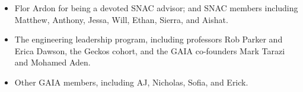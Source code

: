\begin{itemize}
  Gabriel, Haley, Robert, Miriam, Andrea, Sofia, Madison D., Nelson, Larry, Mahika, Jacob, Alan, En, Kelvin, Nathan, Jordan, Sabian, Iris, Madison S., Leah, John, Cecily, Ehina, Maddie, Ben, Noam, Vidhi, Alex, Kotey, Moho, Kunj, Hope, Bimali, Ruiyang, Khai, Anthony, Rumman, Kalvin, and Amina.
  Teamwork is really important to me, and working with you all has been a highlight of my PhD.
  Special shout-outs go to Madison D., who has worked with me on MDOcean for 4 years and has grown so much;
  Bimali, who went above and beyond on the MEEM project and whose work features prominently in ;
  and En, Andrea, and Moho, who turned Wait Terrace into a SEA Lab house. 
  \item Flor Ardon for being a devoted SNAC advisor; and SNAC members 
  including Matthew, Anthony, Jessa, Will, Ethan, Sierra, and Aishat.
  \item The engineering leadership program, including professors Rob Parker and Erica Dawson, 
  the Geckos cohort, and the GAIA co-founders Mark Tarazi and Mohamed Aden.
  \item Other GAIA members, including AJ, Nicholas, Sofia, and Erick.
\end{itemize}

